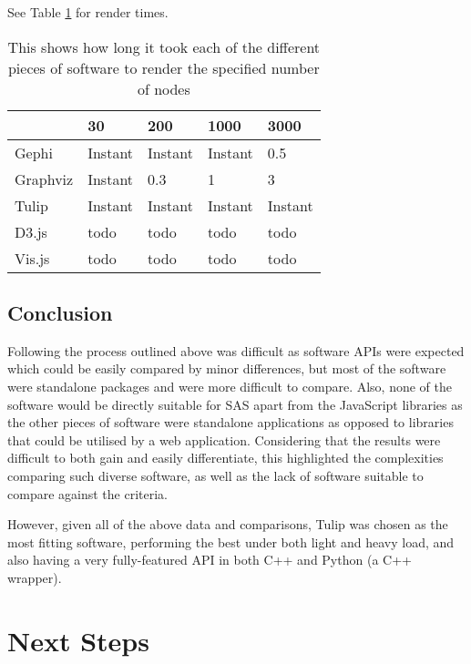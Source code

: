 \documentclass[../dissertation.tex]{subfiles}
\begin{document}
See Table \ref{table:render-times} for render times.

\begin{table}[h]
\centering
\label{table:render-times}
\begin{tabular}{|l|l|l|l|l|}
    \hline
             & 30      & 200     & 1000    & 3000    \\
    \hline
    Gephi    & Instant & Instant & Instant & 0.5     \\
    \hline
    Graphviz & Instant & 0.3     & 1       & 3       \\
    \hline
    Tulip    & Instant & Instant & Instant & Instant \\
    \hline
    D3.js    & todo    & todo    & todo    & todo    \\
    \hline
    Vis.js   & todo    & todo    & todo    & todo   \\
    \hline
\end{tabular}
\caption{This shows how long it took each of the different pieces of software to render the specified number of nodes}
\end{table}


\subsection{Conclusion}

Following the process outlined above was difficult as software APIs were expected which could be easily compared by minor differences, but most of the software were standalone packages and were more difficult to compare. Also, none of the software would be directly suitable for SAS apart from the JavaScript libraries as the other pieces of software were standalone applications as opposed to libraries that could be utilised by a web application. Considering that the results were difficult to both gain and easily differentiate, this highlighted the complexities comparing such diverse software, as well as the lack of software suitable to compare against the criteria.

However, given all of the above data and comparisons, Tulip was chosen as the most fitting software, performing the best under both light and heavy load, and also having a very fully-featured API in both C++ and Python (a C++ wrapper).

\section{Next Steps}
\end{document}
